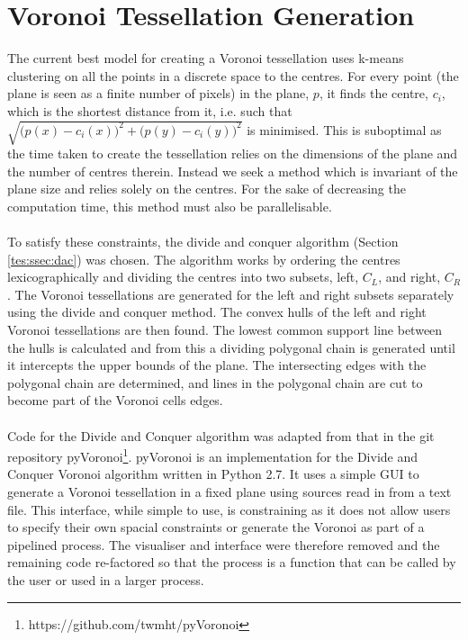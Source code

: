\section{Voronoi Tessellation Generation}\label{des:sec:vor}
The current best model for creating a Voronoi tessellation uses k-means clustering on all the points in a discrete space to the centres. For every point (the plane is seen as a finite number of pixels) in the plane, $p$, it finds the centre, $c_i$, which is the shortest distance from it, i.e. such that $\sqrt{\big(p(x)-c_i(x)\big)^2 + \big(p(y)-c_i(y)\big)^2}$ is minimised. This is suboptimal as the time taken to create the tessellation relies on the dimensions of the plane and the number of centres therein. Instead we seek a method which is invariant of the plane size and relies solely on the centres. For the sake of decreasing the computation time, this method must also be parallelisable. 
\\
\\
To satisfy these constraints, the divide and conquer algorithm (Section \ref{tes:ssec:dac}) was chosen. The algorithm works by ordering the centres lexicographically and dividing the centres into two subsets, left, $C_L$, and right, $C_R$. The Voronoi tessellations are generated for the left and right subsets separately using the divide and conquer method. The convex hulls of the left and right Voronoi tessellations are then found. The lowest common support line between the hulls is calculated and from this a dividing polygonal chain is generated until it intercepts the upper bounds of the plane. The intersecting edges with the polygonal chain are determined, and lines in the polygonal chain are cut to become part of the Voronoi cells edges.
\\
\\
Code for the Divide and Conquer algorithm was adapted from that in the git repository pyVoronoi\footnote{https://github.com/twmht/pyVoronoi}. pyVoronoi is an implementation for the Divide and Conquer Voronoi algorithm written in Python 2.7. It uses a simple GUI to generate a Voronoi tessellation in a fixed plane using sources read in from a text file. This interface, while simple to use, is constraining as it does not allow users to specify their own spacial constraints or generate the Voronoi as part of a pipelined process. The visualiser and interface were therefore removed and the remaining code re-factored so that the process is a function that can be called by the user or used in a larger process.

